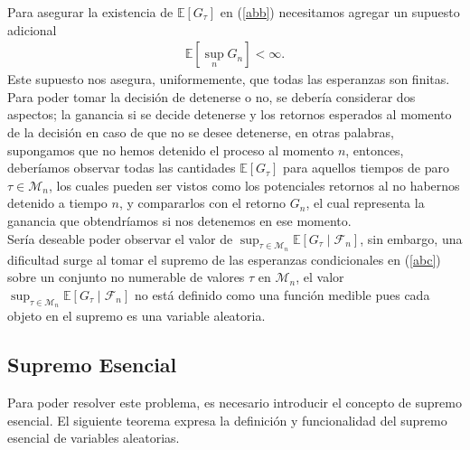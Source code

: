 Para asegurar la existencia de $\mathbb{E}[G_\tau]$ en (\ref{abb}) necesitamos agregar un supuesto adicional
	\begin{align}
	\mathbb{E} \left[ \sup_n G_n \right] < \infty. \label{abc}
	\end{align}
Este supuesto nos asegura, uniformemente, que todas las esperanzas son finitas.  \\

Para poder tomar la decisión de detenerse o no, se debería considerar dos aspectos; la ganancia si se decide detenerse y los retornos esperados al momento de la decisión en caso de que no se desee detenerse, en otras palabras, supongamos que no hemos detenido el proceso al momento $n$, entonces, deberíamos observar todas las cantidades $\mathbb{E}[G_\tau]$ para aquellos tiempos de paro $\tau \in \mathcal{M}_n$, los cuales pueden ser vistos como los potenciales retornos al no habernos detenido a tiempo $n$, y compararlos con el retorno $G_n$, el cual representa la ganancia que obtendríamos si nos detenemos en ese momento. \\

Sería deseable poder observar el valor de $\sup_{\tau \in \mathcal{M}_n} \mathbb{E}[G_\tau \mid \mathcal{F}_n]$, sin embargo, una dificultad surge al tomar el supremo de las esperanzas condicionales en (\ref{abc}) sobre un conjunto no numerable de valores $\tau$ en $\mathcal{M}_n$, el valor $\sup_{\tau \in \mathcal{M}_n} \mathbb{E}[G_\tau \mid \mathcal{F}_n]$ no está definido como una función medible pues cada objeto en el supremo es una variable aleatoria. \\

\subsection{Supremo Esencial}

Para poder resolver este problema, es necesario introducir el concepto de supremo esencial. El siguiente teorema expresa la definición y funcionalidad del supremo esencial de variables aleatorias.

